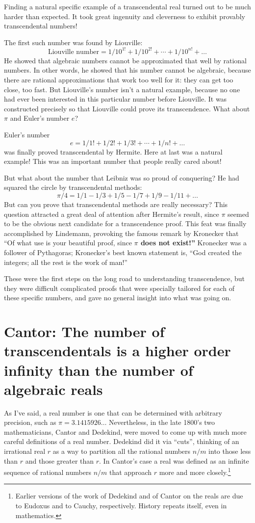 \documentclass[12pt]{book}
\begin{document}
Finding a natural specific example of a transcendental real turned out to be much harder
than expected. It took great ingenuity and cleverness to exhibit provably transcendental numbers!
 
The first such number was found by Liouville:
\[
   \mbox{Liouville number} =  1/10^{1!} + 1/10^{2!} + \cdots + 1/10^{n!} + \ldots
\]
He showed that algebraic numbers cannot be approximated that well by rational numbers.
In other words, he showed that his number cannot be algebraic, because 
there are rational approximations
that work too well for it: they can get too close, too fast.
But Liouville's number isn't a natural example, because no one had ever
 been interested in this particular
number before Liouville.  It was constructed precisely so that Liouville could prove its
transcendence. 
What about
$\pi$ and Euler's number $e$?
 
Euler's number
\[
   e = 1/1! + 1/2! + 1/3! + \cdots + 1/n! + \ldots
\] 
was finally proved transcendental by Hermite.  Here at last was a natural example!
This was an important number that people really cared about!
 
But what about the number that Leibniz was so proud of conquering?  He had squared the circle
by transcendental methods:
\[
   \pi/4 = 1/1 - 1/3 + 1/5 - 1/7 + 1/9 - 1/11 + \ldots
\] 
But can you prove that transcendental methods are really necessary?  
This question attracted a great deal of attention after Hermite's result, since $\pi$ seemed
to be the obvious next candidate for a transcendence proof.
This feat was finally accomplished by
Lindemann, provoking the famous remark by Kronecker that ``Of what use is your beautiful
proof, since \textbf{$\pi$ does not exist!''}  Kronecker was a follower of Pythagoras;
Kronecker's best known statement is,
``God created the integers; all the rest is the work of man!''
 
These were the first steps
on the long road to understanding transcendence,
but they were difficult complicated proofs that were specially
tailored for each of these specific numbers, and gave no general insight into what was going on.

\section*{Cantor: The number of transcendentals is a higher order infinity than the number of algebraic reals}

As I've said, a real number is one that can be determined with arbitrary precision, such as
$\pi = 3.1415926\ldots$
Nevertheless,
in the late 1800's two mathematicians, Cantor and Dedekind, 
were moved to come up with much more careful
definitions of a real number.
Dedekind did it via ``cuts'', thinking of an irrational real $r$ as a way to partition all the rational
numbers $n/m$ into those less than $r$ and those greater than $r$.
In Cantor's case a real was defined as an infinite sequence of rational numbers $n/m$
that approach $r$ more and more closely.\footnote
{Earlier versions of the work of Dedekind and of Cantor
on the reals are due to Eudoxus and to Cauchy, respectively. 
History repeats itself, even in mathematics.}
\end{document}
